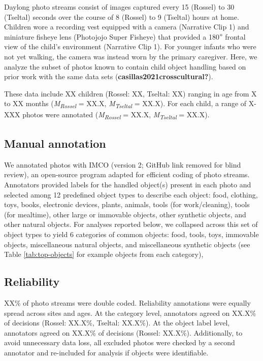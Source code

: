 \documentclass[10pt, letterpaper]{article}
\begin{document}
Daylong photo streams consist of images captured every 15 (Rossel) to 30
(Tseltal) seconds over the course of 8 (Rossel) to 9 (Tseltal) hours at
home. Children wore a recording vest equipped with a camera (Narrative
Clip 1) and miniature fisheye lens (Photojojo Super Fisheye) that
provided a 180\(\text{\textdegree}\) frontal view of the child's
environment (Narrative Clip 1). For younger infants who were not yet
walking, the camera was instead worn by the primary caregiver. Here, we
analyze the subset of photos known to contain child object handling
based on prior work with the same data sets
(\textbf{casillas2021crosscultural?}).

These data include XX children (Rossel: XX, Tseltal: XX) ranging in age
from X to XX months (\emph{M}\textsubscript{\emph{Rossel}} = XX.X,
\emph{M}\textsubscript{\emph{Tseltal}} = XX.X). For each child, a range
of X-XXX photos were annotated (\emph{M}\textsubscript{\emph{Rossel}} =
XX.X, \emph{M}\textsubscript{\emph{Tseltal}} = XX.X).

\hypertarget{manual-annotation}{%
\subsection{Manual annotation}\label{manual-annotation}}

We annotated photos with IMCO (version 2; GitHub link removed for blind
review), an open-source program adapted for efficient coding of photo
streams. Annotators provided labels for the handled object(s) present in
each photo and selected among 12 predefined object types to describe
each object: food, clothing, toys, books, electronic devices, plants,
animals, tools (for work/cleaning), tools (for mealtime), other large or
immovable objects, other synthetic objects, and other natural objects.
For analyses reported below, we collapsed across this set of object
types to yield 6 categories of common objects: food, tools, toys,
immovable objects, miscellaneous natural objects, and miscellaneous
synthetic objects (see Table \ref{tab:top-objects} for example objects
from each category),

\hypertarget{reliability}{%
\subsection{Reliability}\label{reliability}}

XX\% of photo streams were double coded. Reliability annotations were
equally spread across sites and ages. At the category level, annotators
agreed on XX.X\% of decisions (Rossel: XX.X\%, Tseltal: XX.X\%). At the
object label level, annotators agreed on XX.X\% of decisions (Rossel:
XX.X\%). Additionally, to avoid unnecessary data loss, all excluded
photos were checked by a second annotator and re-included for analysis
if objects were identifiable.
\end{document}
